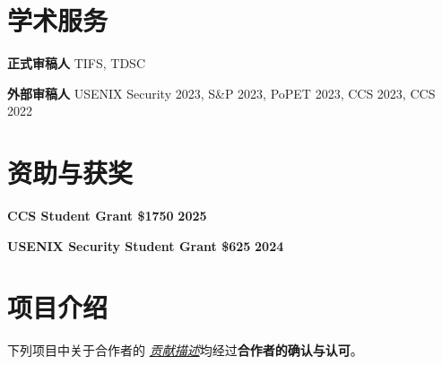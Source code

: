 \documentclass{resume}
\begin{document}
\section{\textbf{学术服务}}
\begin{content}
	\textbf{正式审稿人} \enspace TIFS, TDSC

	\textbf{外部审稿人} \enspace USENIX Security 2023, S\&P 2023, PoPET 2023, CCS 2023, CCS 2022
\end{content}

\section{\textbf{资助与获奖}}
\begin{content}
	\textbf{CCS Student Grant \$1750} \hfill {\bf 2025}

	\textbf{USENIX Security Student Grant \$625} \hfill {\bf 2024}
\end{content}

\section{\textbf{项目介绍}}

下列项目中关于合作者的 \underline{\textit{贡献描述}}均经过\textbf{合作者的确认与认可}。
\end{document}
